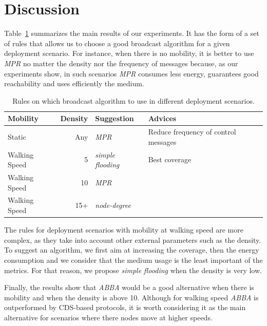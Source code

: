 
\section{Discussion}
\label{sec:discussion}

Table~\ref{tbl:rules} summarizes the main results of our experiments.
%
It has the form of a set of rules that allows us to choose a good broadcast algorithm for a given deployment scenario.
%
For instance, when there is no mobility, it is better to use \textit{MPR} no matter the density nor the frequency of messages because, as our experiments show, in such scenarios \textit{MPR} consumes less energy, guarantees good reachability and uses efficiently the medium.

\begin{table}[ht]
	\footnotesize
	\centering
	
	\begin{tabular}{lr|p{2.4cm}p{2.3cm}}
		\textbf{Mobility} & \textbf{Density} &  \textbf{Suggestion} & \textbf{Advices}\\
		
		\midrule
		Static & Any & \textit{MPR} & Reduce frequency of control messages \\
		Walking Speed & 5 & \textit{simple flooding} & Best coverage  \\
		Walking Speed & 10  & \textit{MPR} &   \\
		Walking Speed & 15+ & \textit{node-degree} &  \\
		
	\end{tabular}
	
	\caption{Rules on which broadcast algorithm to use in different deployment scenarios.}
	\label{tbl:rules}
\end{table}

The rules for deployment scenarios with mobility at walking speed are more complex, as they take into account other external parameters such as the density.
%
To suggest an algorithm, we first aim at increasing the coverage, then the energy consumption and we consider that the medium usage is the least important of the metrics.
%
For that reason, we propose \textit{simple flooding} when the density is very low.
%

Finally, the results show that \textit{ABBA} would be a good alternative when there is mobility and when the density is above 10.
%
Although for walking speed \textit{ABBA} is outperformed by CDS-based protocols, it is worth considering it as the main alternative for scenarios where there nodes move at higher speeds.  
